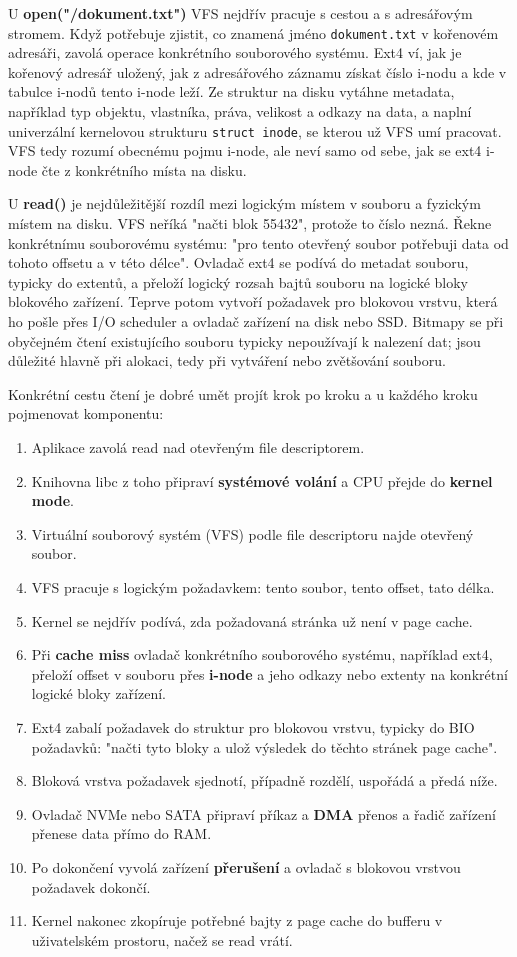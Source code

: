 \documentclass[11pt,a4paper]{article}
\begin{document}
U \textbf{open("/dokument.txt")} VFS nejdřív pracuje s cestou a s adresářovým stromem. Když potřebuje zjistit, co znamená jméno \texttt{dokument.txt} v kořenovém adresáři, zavolá operace konkrétního souborového systému. Ext4 ví, jak je kořenový adresář uložený, jak z adresářového záznamu získat číslo i-nodu a kde v tabulce i-nodů tento i-node leží. Ze struktur na disku vytáhne metadata, například typ objektu, vlastníka, práva, velikost a odkazy na data, a naplní univerzální kernelovou strukturu \texttt{struct inode}, se kterou už VFS umí pracovat. VFS tedy rozumí obecnému pojmu i-node, ale neví samo od sebe, jak se ext4 i-node čte z konkrétního místa na disku.

U \textbf{read()} je nejdůležitější rozdíl mezi logickým místem v souboru a fyzickým místem na disku. VFS neříká "načti blok 55432", protože to číslo nezná. Řekne konkrétnímu souborovému systému: "pro tento otevřený soubor potřebuji data od tohoto offsetu a v této délce". Ovladač ext4 se podívá do metadat souboru, typicky do extentů, a přeloží logický rozsah bajtů souboru na logické bloky blokového zařízení. Teprve potom vytvoří požadavek pro blokovou vrstvu, která ho pošle přes I/O scheduler a ovladač zařízení na disk nebo SSD. Bitmapy se při obyčejném čtení existujícího souboru typicky nepoužívají k nalezení dat; jsou důležité hlavně při alokaci, tedy při vytváření nebo zvětšování souboru.

Konkrétní cestu čtení je dobré umět projít krok po kroku a u každého kroku pojmenovat komponentu:
\begin{enumerate}
  \item Aplikace zavolá read nad otevřeným file descriptorem.
  \item Knihovna libc z toho připraví \textbf{systémové volání} a CPU přejde do \textbf{kernel mode}.
  \item Virtuální souborový systém (VFS) podle file descriptoru najde otevřený soubor.
  \item VFS pracuje s logickým požadavkem: tento soubor, tento offset, tato délka.
  \item Kernel se nejdřív podívá, zda požadovaná stránka už není v page cache.
  \item Při \textbf{cache miss} ovladač konkrétního souborového systému, například ext4, přeloží offset v souboru přes \textbf{i-node} a jeho odkazy nebo extenty na konkrétní logické bloky zařízení.
  \item Ext4 zabalí požadavek do struktur pro blokovou vrstvu, typicky do BIO požadavků: "načti tyto bloky a ulož výsledek do těchto stránek page cache".
  \item Bloková vrstva požadavek sjednotí, případně rozdělí, uspořádá a předá níže.
  \item Ovladač NVMe nebo SATA připraví příkaz a \textbf{DMA} přenos a řadič zařízení přenese data přímo do RAM.
  \item Po dokončení vyvolá zařízení \textbf{přerušení} a ovladač s blokovou vrstvou požadavek dokončí.
  \item Kernel nakonec zkopíruje potřebné bajty z page cache do bufferu v uživatelském prostoru, načež se read vrátí.
\end{enumerate}
\end{document}
